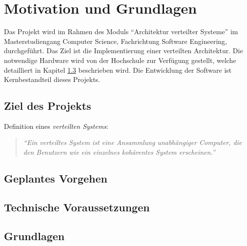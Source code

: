 \chapter{Motivation und Grundlagen}
Das Projekt wird im Rahmen des Moduls \enquote{Architektur verteilter Systeme} im Masterstudiengang Computer Science, Fachrichtung Software Engineering, durchgeführt.  Das Ziel ist die Implementierung einer verteilten Architektur. Die notwendige Hardware wird von der Hochschule zur Verfügung gestellt, welche detailliert in Kapitel \ref{technischeVoraussetzungen} beschrieben wird.
Die Entwicklung der Software ist Kernbestandteil dieses Projekts. 
\section{Ziel des Projekts}
Definition eines \emph{verteilten Systems}:
\begin{quotation}
	\textit{\enquote{Ein verteiltes System ist eine Ansammlung unabhängiger Computer, die den Benutzern wie ein einzelnes kohärentes System erscheinen.}} \citep{tanenbaum}
\end{quotation}


\section{Geplantes Vorgehen}

\section{Technische Voraussetzungen}
\label{technischeVoraussetzungen}

\section{Grundlagen}
\label{grundlagen}




